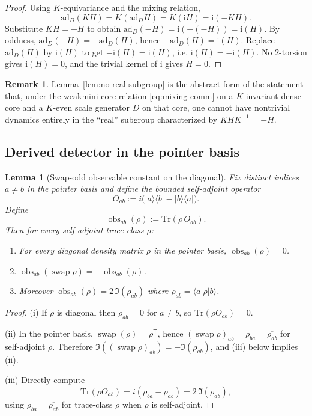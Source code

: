 \documentclass[aps,prl,reprint]{revtex4-2}
\newcommand{\swap}{\operatorname{swap}}
\newcommand{\obs}{\operatorname{obs}}
\theoremstyle{definition}
\newtheorem{remark}{Remark}[section]
\theoremstyle{plain}
\newtheorem{lemma}{Lemma}[section]
\begin{document}
\begin{proof}
Using $K$-equivariance and the mixing relation,
\[\mathrm{ad}_D(KH)=K(\mathrm{ad}_D H)=K(\mathrm{i}H)=\mathrm{i}(-KH).\]
Substitute $KH=-H$ to obtain $\mathrm{ad}_D(-H)=\mathrm{i}(-(-H))=\mathrm{i}(H)$.
By oddness, $\mathrm{ad}_D(-H)=-\mathrm{ad}_D(H)$, hence
$-\mathrm{ad}_D(H)=\mathrm{i}(H)$. Replace $\mathrm{ad}_D(H)$ by $\mathrm{i}(H)$ to get
$-\mathrm{i}(H)=\mathrm{i}(H)$, i.e. $\mathrm{i}(H)=-\mathrm{i}(H)$.
No $2$-torsion gives $\mathrm{i}(H)=0$, and the trivial kernel of $\mathrm{i}$ gives $H=0$.
\end{proof}

\begin{remark}
Lemma~\ref{lem:no-real-subgroup} is the abstract form of the statement that, under
the weakmini core relation \eqref{eq:mixing-comm} on a $K$-invariant dense core and
a $K$-even scale generator $D$ on that core, one cannot have nontrivial dynamics
entirely in the ``real'' subgroup characterized by $KHK^{-1}=-H$.
\end{remark}

\subsection{Derived detector in the pointer basis}

\begin{lemma}[Swap-odd observable constant on the diagonal]
\label{lem:swap-odd-observable}
Fix distinct indices $a\ne b$ in the pointer basis and define the bounded self-adjoint
operator
\[O_{ab}:= i\big(\lvert a\rangle\langle b\rvert-\lvert b\rangle\langle a\rvert\big).\]
Define
\[\obs_{ab}(\rho):=\mathrm{Tr}(\rho\,O_{ab}).\]
Then for every \emph{self-adjoint} trace-class $\rho$:
\begin{enumerate}[label=\textbf{(\roman*)},leftmargin=*,itemsep=0.4em]
\item For every diagonal density matrix $\rho$ in the pointer basis,
$\obs_{ab}(\rho)=0$.
\item $\obs_{ab}(\swap\rho)=-\obs_{ab}(\rho)$.
\item Moreover $\obs_{ab}(\rho)=2\,\Im(\rho_{ab})$ where $\rho_{ab}=\langle a\rvert\rho\lvert b\rangle$.
\end{enumerate}

\end{lemma}

\begin{proof}
(i) If $\rho$ is diagonal then $\rho_{ab}=0$ for $a\ne b$, so $\mathrm{Tr}(\rho O_{ab})=0$.

(ii) In the pointer basis, $\swap(\rho)=\rho^{\mathsf T}$, hence
$(\swap\rho)_{ab}=\rho_{ba}=\overline{\rho_{ab}}$ for self-adjoint $\rho$.
Therefore $\Im((\swap\rho)_{ab})=-\Im(\rho_{ab})$, and (iii) below implies (ii).

(iii) Directly compute
\[\mathrm{Tr}(\rho O_{ab})= i(\rho_{ba}-\rho_{ab})=2\,\Im(\rho_{ab}),\]
using $\rho_{ba}=\overline{\rho_{ab}}$ for trace-class $\rho$ when $\rho$ is self-adjoint.
\end{proof}
\end{document}
